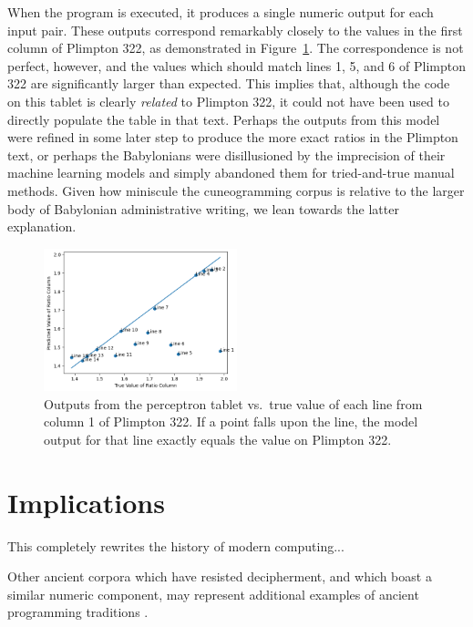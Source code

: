\documentclass[11pt]{article}
\begin{document}
When the program is executed, it produces a single numeric output for each input pair. 
These outputs correspond remarkably closely to the values in the first column of Plimpton 322, as demonstrated in Figure~\ref{fig:graph}.
The correspondence is not perfect, however, and the values which should match lines 1, 5, and 6 of Plimpton 322 are significantly larger than expected.
This implies that, although the code on this tablet is clearly \textit{related} to Plimpton 322, it could not have been used to directly populate the table in that text.
Perhaps the outputs from this model were refined in some later step to produce the more exact ratios in the Plimpton text, or perhaps the Babylonians were disillusioned by the imprecision of their machine learning models and simply abandoned them for tried-and-true manual methods. 
Given how miniscule the cuneogramming corpus is relative to the larger body of Babylonian administrative writing, we lean towards the latter explanation.

\begin{figure}
    \includegraphics[width=0.5\textwidth]{graph.png}
    \caption{Outputs from the perceptron tablet vs.\ true value of each line from column 1 of Plimpton 322. If a point falls upon the line, the model output for that line exactly equals the value on Plimpton 322.}
    \label{fig:graph}
\end{figure}


\section{Implications}
This completely rewrites the history of modern computing... 

Other ancient corpora which have resisted decipherment, and which boast a similar numeric component, may represent additional examples of ancient programming traditions \cite{kelley2022}.
\end{document}
